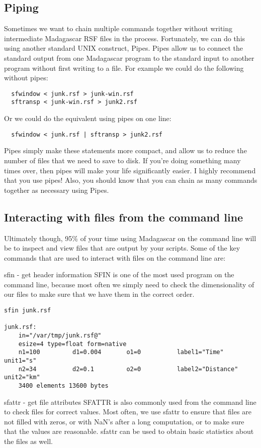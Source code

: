 \subsection{Piping}
Sometimes we want to chain multiple commands together without writing intermediate Madagascar RSF files in the process. Fortunately, we can do this using another standard UNIX construct, Pipes. Pipes allow us to connect the standard output from one Madagascar program to the standard input to another program without first writing to a file. For example we could do the following without pipes:
\begin{verbatim}
  sfwindow < junk.rsf > junk-win.rsf
  sftransp < junk-win.rsf > junk2.rsf
  \end{verbatim}
Or we could do the equivalent using pipes on one line:
\begin{verbatim}
  sfwindow < junk.rsf | sftransp > junk2.rsf
  \end{verbatim}
Pipes simply make these statements more compact, and allow us to reduce the number of files that we need to save to disk. If you're doing something many times over, then pipes will make your life significantly easier. I highly recommend that you use pipes! Also, you should know that you can chain as many commands together as necessary using Pipes.

\subsection{Interacting with files from the command line}

Ultimately though, 95\% of your time using Madagascar on the command line will be to inspect and view files that are output by your scripts. Some of the key commands that are used to interact with files on the command line are:

sfin - get header information
SFIN is one of the most used program on the command line, because most often we simply need to check the dimensionality of our files to make sure that we have them in the correct order.
\begin{verbatim}
sfin junk.rsf
 
junk.rsf:
    in="/var/tmp/junk.rsf@"
    esize=4 type=float form=native 
    n1=100         d1=0.004       o1=0          label1="Time" unit1="s" 
    n2=34          d2=0.1         o2=0          label2="Distance" unit2="km" 
	3400 elements 13600 bytes
    \end{verbatim}

sfattr - get file attributes
SFATTR is also commonly used from the command line to check files for correct values. Most often, we use sfattr to ensure that files are not filled with zeros, or with NaN's after a long computation, or to make sure that the values are reasonable. sfattr can be used to obtain basic statistics about the files as well.

